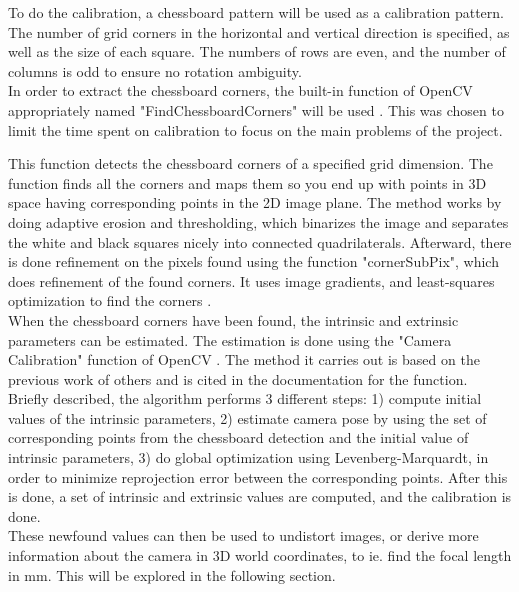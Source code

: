 To do the calibration, a chessboard pattern will be used as a calibration pattern. The number of grid corners in the horizontal and vertical direction is specified, as well as the size of each square. The numbers of rows are even, and the number of columns is odd to ensure no rotation ambiguity.\\ 


In order to extract the chessboard corners, the built-in function of OpenCV appropriately named "FindChessboardCorners" will be used \cite{findchessboardcornersOpenCV}. This was chosen to limit the time spent on calibration to focus on the main problems of the project. 

This function detects the chessboard corners of a specified grid dimension. 
The function finds all the corners and maps them so you end up with points in 3D space having corresponding points in the 2D image plane. The method works by doing adaptive erosion and thresholding, which binarizes the image and separates the white and black squares nicely into connected quadrilaterals. Afterward, there is done refinement on the pixels found using the function "cornerSubPix", which does refinement of the found corners. It uses image gradients, and least-squares optimization to find the corners \cite{AlgoForChessBoardDetection}. \\

When the chessboard corners have been found, the intrinsic and extrinsic parameters can be estimated. The estimation is done using the "Camera Calibration" function of OpenCV \cite{calibrateCameraOpenCV}. The method it carries out is based on the previous work of others and is cited in the documentation for the function. Briefly described, the algorithm performs 3 different steps: 1) compute initial values of the intrinsic parameters, 
2) estimate camera pose by using the set of corresponding points from the chessboard detection and the initial value of intrinsic parameters, 
3) do global optimization using Levenberg-Marquardt, in order to minimize reprojection error between the corresponding points. After this is done, a set of intrinsic and extrinsic values are computed, and the calibration is done.\\ 


These newfound values can then be used to undistort images, or derive more information about the camera in 3D world coordinates, to ie. find the focal length in mm. This will be explored in the following section.



